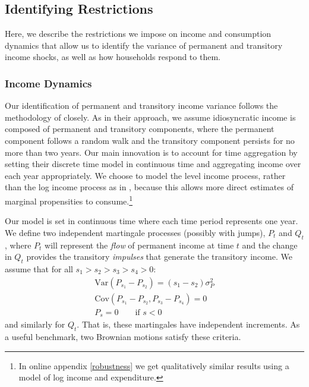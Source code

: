 \documentclass[titlepage]{\econtex}\newcommand{\texname}{ConsumptionHeterogeneity}
\begin{document}
	\subsection{Identifying Restrictions} \label{cov_restrictions}
	Here, we describe the restrictions we impose on income and consumption dynamics that allow us to identify the variance of permanent and transitory income shocks, as well as how households respond to them. 
	
	\subsubsection{Income Dynamics}
	Our identification of permanent and transitory income variance follows the methodology of \cite{carroll_nature_1997} closely. As in their approach, we assume idiosyncratic income is composed of permanent and transitory components, where the permanent component follows a random walk and the transitory component persists for no more than two years. Our main innovation is to account for time aggregation by setting their discrete time model in continuous time and aggregating income over each year appropriately. We choose to model the level income process, rather than the log income process as in \cite{carroll_nature_1997}, because this allows more direct estimates of marginal propensities to consume.\footnote{In online appendix \ref{robustness} we get qualitatively similar results using a model of log income and expenditure.}
	
	Our model is set in continuous time where each time period represents one year. We define two independent martingale processes (possibly with jumps), $P_t$ and $Q_t$, where $P_t$ will represent the \textit{flow} of permanent income at time $t$ and the change in $Q_t$ provides the transitory \textit{impulses} that generate the transitory income. We assume that for all  $s_1>s_2>s_3>s_4>0$:
	\begin{align*}
	\mathrm{Var}(P_{s_1}-P_{s_2})=(s_1-s_2)\sigma_P^2 \\
	\mathrm{Cov}(P_{s_1}-P_{s_2},P_{s_3}-P_{s_4}) = 0 \\
	P_s = 0 \qquad \text{if } s<0
	\end{align*}
	and similarly for $Q_t$. That is, these martingales have independent increments. As a useful benchmark, two Brownian motions satisfy these criteria.
	
\end{document}
